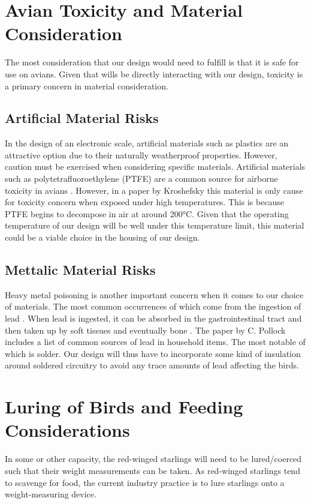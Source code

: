 \documentclass[class=report,11pt,crop=false]{standalone}
\begin{document}
\section{Avian Toxicity and Material Consideration}
The most consideration that our design would need to fulfill is that it is safe for use on avians. Given that wills be directly interacting with our design, toxicity is a primary concern in material consideration. 

\subsection{Artificial Material Risks}
In the design of an electronic scale, artificial materials such as plastics are an attractive option due to their naturally weatherproof properties. However, caution must be exercised when considering specific materials. Artificial materials such as polytetrafluoroethylene (PTFE) are a common source for airborne toxicity in avians \cite{LightfootToxicity}. However, in a paper by Kroshefsky \cite{KroshefskyTeflon} this material is only cause for toxicity concern when exposed under high temperatures. This is because PTFE begins to decompose in air at around 200°C. Given that the operating temperature of our design will be well under this temperature limit, this material could be a viable choice in the housing of our design.

\subsection{Mettalic Material Risks}
Heavy metal poisoning is another important concern when it comes to our choice of materials. The most common occurrences of which come from the ingestion of lead \cite{PollockHeavyMetal}. When lead is ingested, it can be absorbed in the gastrointestinal tract and then taken up by soft tissues and eventually bone \cite{PollockHeavyMetal}. The paper by C. Pollock includes a list of common sources of lead in household items. The most notable of which is solder. Our design will thus have to incorporate some kind of insulation around soldered circuitry to avoid any trace amounts of lead affecting the birds.

\pagebreak
\section{Luring of Birds and Feeding Considerations}
In some or other capacity, the red-winged starlings will need to be lured/coerced such that their weight measurements can be taken. As red-winged starlings tend to scavenge for food, the current industry practice is to lure starlings onto a weight-measuring device. 
\end{document}
